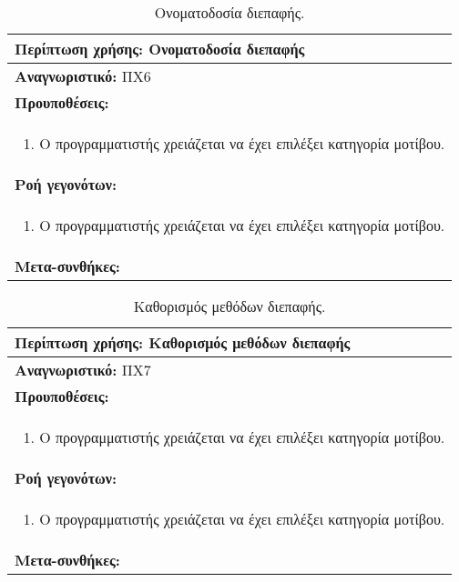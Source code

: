 \begin{table}[H]
	\hspace*{-0.2cm}
    \centering
    \scriptsize
	\begin{tabular}{|p{10cm}|}
	\hline
		\textbf{Περίπτωση χρήσης:} Ονοματοδοσία διεπαφής  \\
	\hline
		\textbf{Αναγνωριστικό:} ΠΧ6 \\
	\hline	
		\textbf{Προυποθέσεις:} \\
		\begin{enumerate}
		 \item Ο προγραμματιστής χρειάζεται να έχει επιλέξει κατηγορία μοτίβου.
		\end{enumerate} \\
	\hline
		\textbf{Ροή γεγονότων:} \\
		\begin{enumerate}
		 \item Ο προγραμματιστής χρειάζεται να έχει επιλέξει κατηγορία μοτίβου.
		\end{enumerate} \\
	\hline
		\textbf{Μετα-συνθήκες:} \\
	\hline
    \end{tabular}
    \caption{Ονοματοδοσία διεπαφής.}
    \label{tab:nameInterfaceUC}
\end{table}
\begin{table}[H]
	\hspace*{-0.2cm}
    \centering
    \scriptsize
	\begin{tabular}{|p{10cm}|}
	\hline
		\textbf{Περίπτωση χρήσης:} Καθορισμός μεθόδων διεπαφής \\
	\hline
		\textbf{Αναγνωριστικό:} ΠΧ7 \\
	\hline	
		\textbf{Προυποθέσεις:} \\
		\begin{enumerate}
		 \item Ο προγραμματιστής χρειάζεται να έχει επιλέξει κατηγορία μοτίβου.
		\end{enumerate} \\
	\hline
		\textbf{Ροή γεγονότων:} \\
		\begin{enumerate}
		 \item Ο προγραμματιστής χρειάζεται να έχει επιλέξει κατηγορία μοτίβου.
		\end{enumerate} \\
	\hline
		\textbf{Μετα-συνθήκες:} \\
	\hline
    \end{tabular}
    \caption{Καθορισμός μεθόδων διεπαφής.}
    \label{tab:setInterfaceMethodsUC}
\end{table}
